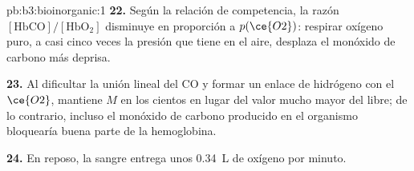 \begin{solution}{pb:b3:bioinorganic:1}
\textbf{22.} Según la relación de competencia, la razón $[\mathrm{HbCO}]/[\mathrm{HbO_2}]$ disminuye en proporción a $p(\ce{O2})$:
respirar oxígeno puro, a casi cinco veces la presión que tiene en el aire, desplaza el monóxido de
carbono más deprisa.

\textbf{23.} Al dificultar la unión lineal del CO y formar un enlace de hidrógeno con el $\ce{O2}$, mantiene $M$ en
los cientos en lugar del valor mucho mayor del  libre; de lo contrario, incluso el
monóxido de carbono producido en el organismo bloquearía buena parte de la hemoglobina.

\textbf{24.} En reposo, la sangre entrega unos \qty{0.34}{L} de oxígeno por minuto.
\end{solution}
